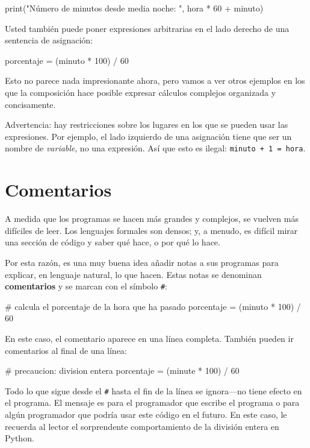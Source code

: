\beforeverb
\begin{pythoncode}
print("Número de minutos desde media noche: ", hora * 60 + minuto)
\end{pythoncode}
\afterverb
%

Usted también puede poner  expresiones arbitrarias en el lado derecho de
una sentencia de asignación:

\beforeverb
\begin{pythoncode}
porcentaje = (minuto * 100) / 60
\end{pythoncode}
\afterverb
%

Esto no parece nada impresionante ahora, pero vamos a ver otros ejemplos
en los que la composición hace posible expresar cálculos complejos organizada
y concisamente.

Advertencia: hay restricciones sobre los lugares en los que 
se pueden usar las expresiones. Por ejemplo, el lado izquierdo de una 
asignación tiene que ser un nombre de {\em variable}, no una expresión.  Así 
que esto es ilegal: 
\texttt{minuto + 1 = hora}.

\section{Comentarios}

A medida que los programas se hacen más grandes y complejos, se vuelven más
difíciles de leer. Los lenguajes formales son densos; y, a menudo, es difícil
mirar una sección de código y saber qué hace, o por qué lo hace.

Por esta razón, es una muy buena idea añadir notas a sus programas para
explicar, en lenguaje natural, lo que hacen. Estas notas se denominan
{\bf comentarios }y se marcan con el símbolo \texttt{\#}:

\beforeverb
\begin{pythoncode}
# calcula el porcentaje de la hora que ha pasado
porcentaje = (minuto * 100) / 60
\end{pythoncode}
\afterverb
%

En este caso, el comentario aparece en una línea completa. También pueden ir 
comentarios al final de una línea:

\beforeverb
\begin{pythoncode}
# precaucion: division entera
porcentaje = (minute * 100) / 60   
\end{pythoncode}
\afterverb
%

Todo lo que sigue desde el \texttt{\#} hasta el fin de la línea se ignora---no 
tiene efecto en el programa. El mensaje es para el programador que escribe
el programa o para algún programador que podría usar este código en el futuro.
En este caso, le recuerda al lector el sorprendente comportamiento de la 
división entera en Python.

